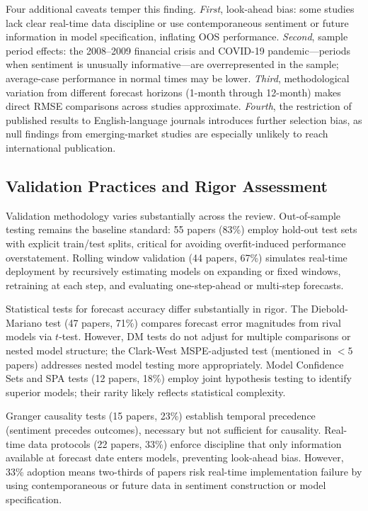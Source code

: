 \documentclass[11pt,twocolumn]{article}
\begin{document}
Four additional caveats temper this finding. \emph{First}, look-ahead bias: some studies lack clear real-time data discipline or use contemporaneous sentiment or future information in model specification, inflating OOS performance. \emph{Second}, sample period effects: the 2008--2009 financial crisis and COVID-19 pandemic---periods when sentiment is unusually informative---are overrepresented in the sample; average-case performance in normal times may be lower. \emph{Third}, methodological variation from different forecast horizons (1-month through 12-month) makes direct RMSE comparisons across studies approximate. \emph{Fourth}, the restriction of published results to English-language journals introduces further selection bias, as null findings from emerging-market studies are especially unlikely to reach international publication.

\subsection{Validation Practices and Rigor Assessment}

Validation methodology varies substantially across the review. Out-of-sample testing remains the baseline standard: 55 papers (83\%) employ hold-out test sets with explicit train/test splits, critical for avoiding overfit-induced performance overstatement. Rolling window validation (44 papers, 67\%) simulates real-time deployment by recursively estimating models on expanding or fixed windows, retraining at each step, and evaluating one-step-ahead or multi-step forecasts.

Statistical tests for forecast accuracy differ substantially in rigor. The Diebold-Mariano test (47 papers, 71\%) compares forecast error magnitudes from rival models via $t$-test. However, DM tests do not adjust for multiple comparisons or nested model structure; the Clark-West MSPE-adjusted test (mentioned in $<5$ papers) addresses nested model testing more appropriately. Model Confidence Sets and SPA tests (12 papers, 18\%) employ joint hypothesis testing to identify superior models; their rarity likely reflects statistical complexity.

Granger causality tests (15 papers, 23\%) establish temporal precedence (sentiment precedes outcomes), necessary but not sufficient for causality. Real-time data protocols (22 papers, 33\%) enforce discipline that only information available at forecast date enters models, preventing look-ahead bias. However, 33\% adoption means two-thirds of papers risk real-time implementation failure by using contemporaneous or future data in sentiment construction or model specification.
\end{document}
